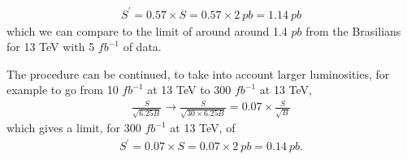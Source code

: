 \documentclass[12pt,a4paper]{article}
\begin{document}
\begin{align}
  S^{\prime} = 0.57 \times S = 0.57 \times 2 ~pb = 1.14 ~pb
\end{align}
which we can compare to the limit of around around 1.4 $pb$ from the Brasilians for 13 TeV with 5 $fb^{-1}$ of data.

The procedure can be continued, to take into account larger luminosities, for example to go from 10 $fb^{-1}$ at 13 TeV to 300 $fb^{-1}$ at 13 TeV,
\begin{align}
  \frac{S}{\sqrt{6.25 B}} \to \frac{S}{\sqrt{30 \times 6.25 B}} = 0.07 \times \frac{S}{\sqrt{B}}
\end{align}
which gives a limit, for 300 $fb^{-1}$ at 13 TeV, of
\begin{align}
  S^{\prime} = 0.07 \times S = 0.07 \times 2 ~pb = 0.14 ~pb.
\end{align}
\end{document}
